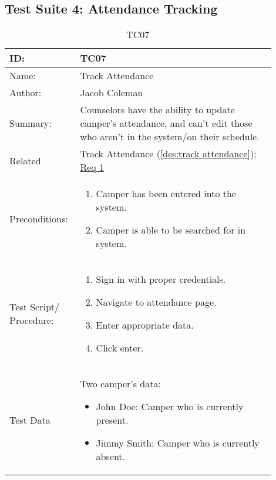 \documentclass[11pt]{article}
\begin{document}
\subsection*{Test Suite 4: Attendance Tracking}

\begin{table}[H]
\begin{center}
\caption{TC07}
\label{TC07}
\begin{tabular}{p{0.20\linewidth}p{0.70\linewidth}}
	ID: & TC07\\\hline
	Name: & Track Attendance \\\hline
	Author: & Jacob Coleman\\\hline
	Summary: & Counselors have the ability to update camper's attendance, and can't edit those who aren't in the system/on their schedule. \\\hline
	Related \hspace{5em} & Track Attendance (\cref{des:track attendance}); \hyperlink{Req1}{Req 1}\\\hline
	Preconditions:& \begin{enumerate}[topsep=0pt] 
		\item Camper has been entered into the system.
		\item Camper is able to be searched for in system.
	\end{enumerate}\\\hline
	Test Script/ Procedure: & \begin{enumerate}[topsep=0pt]
		\item Sign in with proper credentials.
		\item Navigate to attendance page.
		\item Enter appropriate data.
		\item Click enter.
	\end{enumerate}\\\hline
	Test Data & \vspace*{.25em} Two camper's data:
	\begin{itemize}[topsep=0pt]
		\item John Doe: Camper who is currently present.
		\item Jimmy Smith: Camper who is currently absent.
	\end{itemize}
\end{tabular}
\end{center}
\end{table}
\end{document}
